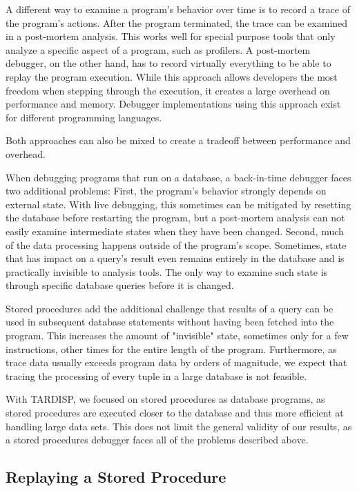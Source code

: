 \documentclass[english]{sig-alternate-05-2015}
\newcommand{\todo}[2][]{\pdfmargincomment[author={#1}]{#2}}
\newcommand{\tool}{TARDISP}
\begin{document}
A different way to examine a program's behavior over time is to record a trace of the program's actions.
After the program terminated, the trace can be examined in a post-mortem analysis.
This works well for special purpose tools that only analyze a specific aspect of a program, such as profilers.
A post-mortem debugger, on the other hand, has to record virtually everything to be able to replay the program execution.
While this approach allows developers the most freedom when stepping through the execution, it creates a large overhead on performance and memory.
Debugger implementations using this approach exist for different programming languages.

Both approaches can also be mixed to create a tradeoff between performance and overhead\todo{cite}.

When debugging programs that run on a database, a back-in-time debugger faces two additional problems:
First, the program's behavior strongly depends on external state.
With live debugging, this sometimes can be mitigated by resetting the database before restarting the program, but a post-mortem analysis can not easily examine intermediate states when they have been changed.
Second, much of the data processing happens outside of the program's scope.
Sometimes, state that has impact on a query's result even remains entirely in the database and is practically invisible to analysis tools.
The only way to examine such state is through specific database queries before it is changed.

Stored procedures add the additional challenge that results of a query can be used in subsequent database statements without having been fetched into the program.
This increases the amount of "invisible" state, sometimes only for a few instructions, other times for the entire length of the program.
Furthermore, as trace data usually exceeds program data by orders of magnitude, we expect that tracing the processing of every tuple in a large database is not feasible.

With \tool, we focused on stored procedures as database programs, as stored procedures are executed closer to the database and thus more efficient at handling large data sets.
This does not limit the general validity of our results, as a stored procedures debugger faces all of the problems described above.

\subsection{Replaying a Stored Procedure}
\end{document}
